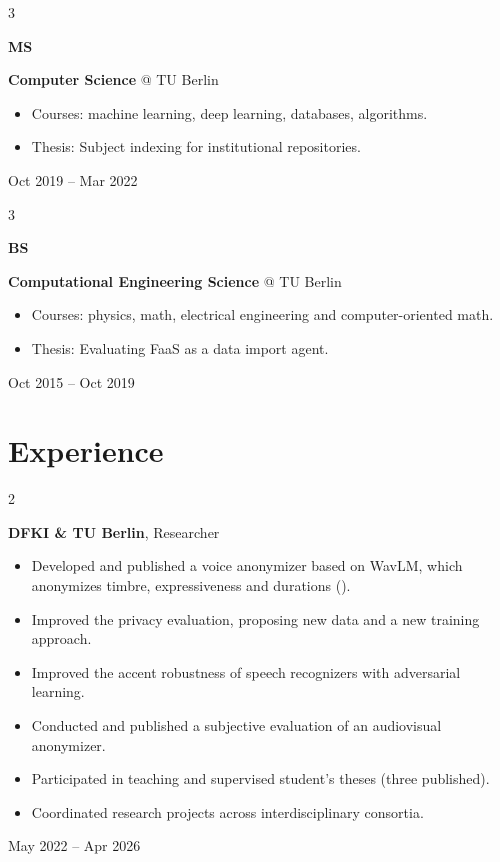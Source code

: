 \documentclass[10pt, letterpaper]{article}
\newenvironment{highlights}{
    \begin{itemize}[
        topsep=0.10 cm,
        parsep=0.10 cm,
        partopsep=0pt,
        itemsep=-0.2em,
        leftmargin=0.4 cm + 10pt
    ]
}{
    \end{itemize}
} %
\newenvironment{twocolentry}[2][]{
    \onecolentry
    \def\secondColumn{#2}
    \setcolumnwidth{\fill, 4.5 cm}
    \begin{paracol}{2}
}{
    \switchcolumn \raggedleft \secondColumn
    \end{paracol}
    \endonecolentry
} %
\newenvironment{threecolentry}[3][]{
    \onecolentry
    \def\thirdColumn{#3}
    \setcolumnwidth{1 cm, \fill, 4.5 cm}
    \begin{paracol}{3}
    {\raggedright #2} \switchcolumn
}{
    \switchcolumn \raggedleft \thirdColumn
    \end{paracol}
    \endonecolentry
} %
\let\hrefWithoutArrow\href
\renewcommand{\href}[2]{\hrefWithoutArrow{#1}{\ifthenelse{\equal{#2}{}}{ }{#2 }\raisebox{.15ex}{\footnotesize \faExternalLink*}}}
\begin{document}
        \begin{threecolentry}{\textbf{MS}}{Oct 2019 – Mar 2022}
            \textbf{Computer Science} @ TU Berlin
            \begin{highlights}
                \item Courses: machine learning, deep learning, databases, algorithms.
                \item Thesis: Subject indexing for institutional repositories.
            \end{highlights}
        \end{threecolentry}

        \begin{threecolentry}{\textbf{BS}}{Oct 2015 – Oct 2019}
            \textbf{Computational Engineering Science} @ TU Berlin
            \begin{highlights}
                \item Courses: physics, math, electrical engineering and computer-oriented math.
                \item Thesis: Evaluating FaaS as a data import agent.
            \end{highlights}
        \end{threecolentry}
    
    \section{Experience}
   
        \begin{twocolentry}{May 2022 – Apr 2026}
            \textbf{DFKI \& TU Berlin}, Researcher
            \begin{highlights}
                \item Developed and published a voice anonymizer based on WavLM, which anonymizes timbre, expressiveness and durations (\href{https://carlosfranzreb.github.io/private-knnvc}{Blog post}).
                \item Improved the privacy evaluation, proposing new data and a new training approach.
                \item Improved the accent robustness of speech recognizers with adversarial learning.
                \item Conducted and published a subjective evaluation of an audiovisual anonymizer.
                \item Participated in teaching and supervised student's theses (three published).
                \item Coordinated research projects across interdisciplinary consortia.
            \end{highlights}
        \end{twocolentry}
\end{document}
